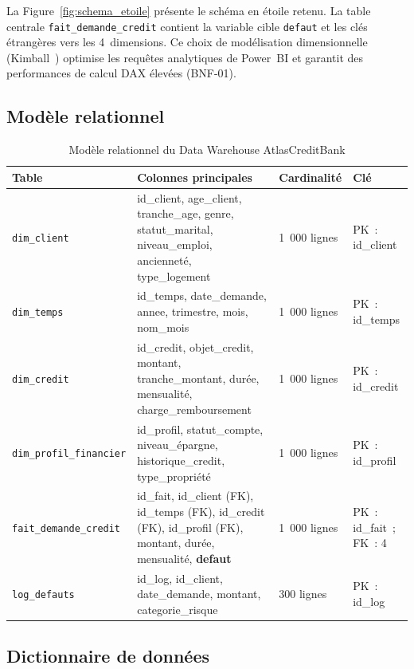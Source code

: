 \documentclass[12pt, a4paper]{report}
\begin{document}
La Figure~\ref{fig:schema_etoile} présente le schéma en étoile retenu. La table
centrale \texttt{fait\_demande\_credit} contient la variable cible \texttt{defaut}
et les clés étrangères vers les 4~dimensions. Ce choix de modélisation dimensionnelle
(Kimball~\cite{kimball}) optimise les requêtes analytiques de Power~BI et garantit
des performances de calcul DAX élevées (BNF-01).

\subsection{Modèle relationnel}

\begin{table}[H]
\centering
\caption{Modèle relationnel du Data Warehouse AtlasCreditBank}
\label{tab:relationnel}
\renewcommand{\arraystretch}{1.8}
\begin{tabularx}{\textwidth}{p{4.5cm} X p{1.5cm} p{2cm}}
\toprule
\rowcolor{primary!12}
Table & Colonnes principales & Cardinalité & Clé \\
\midrule
\texttt{dim\_client}           & id\_client, age\_client, tranche\_age, genre, statut\_marital, niveau\_emploi, ancienneté, type\_logement & 1~000 lignes & PK~: id\_client \\
\texttt{dim\_temps}            & id\_temps, date\_demande, annee, trimestre, mois, nom\_mois & 1~000 lignes & PK~: id\_temps \\
\texttt{dim\_credit}           & id\_credit, objet\_credit, montant, tranche\_montant, durée, mensualité, charge\_remboursement & 1~000 lignes & PK~: id\_credit \\
\texttt{dim\_profil\_financier}& id\_profil, statut\_compte, niveau\_épargne, historique\_credit, type\_propriété & 1~000 lignes & PK~: id\_profil \\
\texttt{fait\_demande\_credit} & id\_fait, id\_client (FK), id\_temps (FK), id\_credit (FK), id\_profil (FK), montant, durée, mensualité, \textbf{defaut} & 1~000 lignes & PK~: id\_fait~; FK~: 4 \\
\texttt{log\_defauts}          & id\_log, id\_client, date\_demande, montant, categorie\_risque & 300 lignes & PK~: id\_log \\
\bottomrule
\end{tabularx}
\end{table}

\subsection{Dictionnaire de données}
\end{document}
